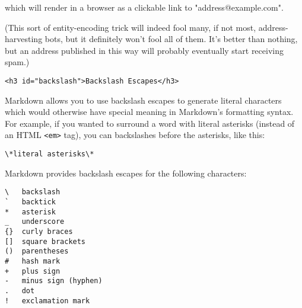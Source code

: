 which will render in a browser as a clickable link to "address@example.com".



(This sort of entity-encoding trick will indeed fool many, if not
most, address-harvesting bots, but it definitely won't fool all of
them. It's better than nothing, but an address published in this way
will probably eventually start receiving spam.)

\begin{lstlisting}<h3 id="backslash">Backslash Escapes</h3>\end{lstlisting}




Markdown allows you to use backslash escapes to generate literal
characters which would otherwise have special meaning in Markdown's
formatting syntax. For example, if you wanted to surround a word with
literal asterisks (instead of an HTML \texttt{<em>} tag), you can backslashes
before the asterisks, like this:

\begin{lstlisting}
\*literal asterisks\*
\end{lstlisting}




Markdown provides backslash escapes for the following characters:

\begin{lstlisting}
\   backslash
`   backtick
*   asterisk
_   underscore
{}  curly braces
[]  square brackets
()  parentheses
#   hash mark
+   plus sign
-   minus sign (hyphen)
.   dot
!   exclamation mark
\end{lstlisting}

